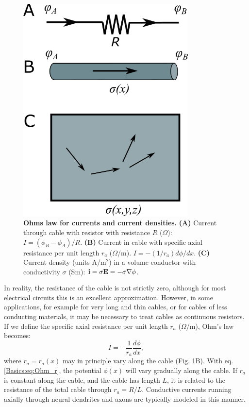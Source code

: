\begin{figure}[!ht]
\begin{center}
\includegraphics[width=0.8\textwidth]{Figures/Basics/Currents.png}
\end{center}
\caption{{\bf Ohms law for currents and current densities.} {\bf (A)} Current through cable with resistor with resistance $R$ ($\Omega$): $I = (\phi_B-\phi_A)/R$. {\bf (B)} Current in cable with specific axial resistance per unit length $r_a$ ($\Omega$/m).  $I=- (1/r_a) d\phi/dx$. {\bf (C)} Current density (units A/m$^2$) in a volume conductor with conductivity $\sigma$ (Sm): ${\bf i} = \sigma {\bf E} = - \sigma \nabla \phi$.}
\label{Basics:fig:Currents}
\end{figure}

In reality, the resistance of the cable is not strictly zero, although for most electrical circuits this is an excellent approximation. However, in some applications, for example for very long and thin cables, or for cables of less conducting materials, it may be necessary to treat cables as continuous resistors. If we define the specific axial resistance per unit length $r_{a}$ ($\Omega$/m), Ohm's law becomes: 
\begin{equation}
I = - \frac{1}{r_a}\frac{d\phi}{dx}, 
\label{Basics:eq:Ohm_r}
\end{equation}
where $r_a=r_a(x)$ may in principle vary along the cable (Fig. \ref{Basics:fig:Currents}B). With eq. \ref{Basics:eq:Ohm_r}, the potential $\phi(x)$ will vary gradually along the cable. If $r_a$ is constant along the cable, and the cable has length $L$, it is related to the resistance of the total cable through $r_a=R/L$. Conductive currents running axially through neural dendrites and axons are typically modeled in this manner. 

